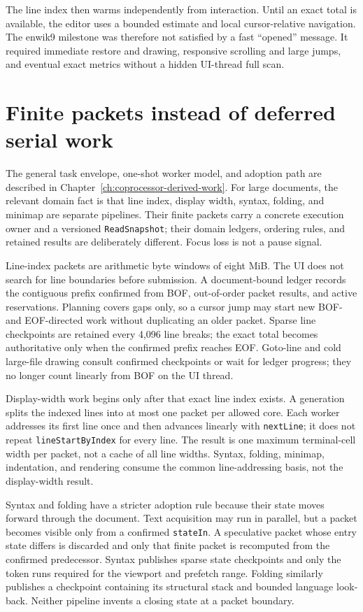 \documentclass[a4paper,10pt,twoside,openany]{book}
\begin{document}
The line index then warms independently from interaction. Until an exact total
is available, the editor uses a bounded estimate and local cursor-relative
navigation. The enwik9 milestone was therefore not satisfied by a fast
``opened'' message. It required immediate restore and drawing, responsive
scrolling and large jumps, and eventual exact metrics without a hidden
UI-thread full scan.

\section{Finite packets instead of deferred serial work}

The general task envelope, one-shot worker model, and adoption path are
described in Chapter~\ref{ch:coprocessor-derived-work}. For large documents,
the relevant domain fact is that line index, display width, syntax, folding,
and minimap are separate pipelines. Their finite packets carry a concrete
execution owner and a versioned \texttt{ReadSnapshot}; their domain ledgers,
ordering rules, and retained results are deliberately different. Focus loss
is not a pause signal.

Line-index packets are arithmetic byte windows of eight MiB. The UI does not
search for line boundaries before submission. A document-bound ledger records
the contiguous prefix confirmed from BOF, out-of-order packet results, and
active reservations. Planning covers gaps only, so a cursor jump may start new
BOF- and EOF-directed work without duplicating an older packet. Sparse line
checkpoints are retained every 4,096 line breaks; the exact total becomes
authoritative only when the confirmed prefix reaches EOF. Goto-line and cold
large-file drawing consult confirmed checkpoints or wait for ledger progress;
they no longer count linearly from BOF on the UI thread.

Display-width work begins only after that exact line index exists. A generation
splits the indexed lines into at most one packet per allowed core. Each worker
addresses its first line once and then advances linearly with
\texttt{nextLine}; it does not repeat \texttt{lineStartByIndex} for every
line. The result is one maximum terminal-cell width per packet, not a cache of
all line widths. Syntax, folding, minimap, indentation, and rendering consume
the common line-addressing basis, not the display-width result.

Syntax and folding have a stricter adoption rule because their state moves
forward through the document. Text acquisition may run in parallel, but a
packet becomes visible only from a confirmed \texttt{stateIn}. A speculative
packet whose entry state differs is discarded and only that finite packet is
recomputed from the confirmed predecessor. Syntax publishes sparse state
checkpoints and only the token runs required for the viewport and prefetch
range. Folding similarly publishes a checkpoint containing its structural
stack and bounded language look-back. Neither pipeline invents a closing state
at a packet boundary.
\end{document}
